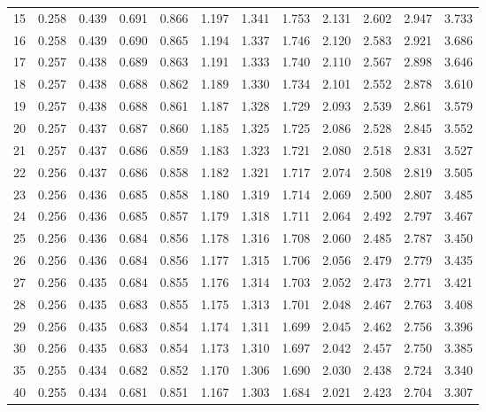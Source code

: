 \documentclass[a4paper, 10pt]{article}
\begin{document}
\begin{center}
\begin{supertabular}{rrrrrrrrrrrr}
        15       & 0.258 & 0.439 & 0.691 & 0.866 & 1.197 & 1.341 & 1.753 & 2.131  & 2.602  & 2.947  & 3.733 \\
        16       & 0.258 & 0.439 & 0.690 & 0.865 & 1.194 & 1.337 & 1.746 & 2.120  & 2.583  & 2.921  & 3.686 \\
        17       & 0.257 & 0.438 & 0.689 & 0.863 & 1.191 & 1.333 & 1.740 & 2.110  & 2.567  & 2.898  & 3.646 \\
        18       & 0.257 & 0.438 & 0.688 & 0.862 & 1.189 & 1.330 & 1.734 & 2.101  & 2.552  & 2.878  & 3.610 \\
        19       & 0.257 & 0.438 & 0.688 & 0.861 & 1.187 & 1.328 & 1.729 & 2.093  & 2.539  & 2.861  & 3.579 \\
        20       & 0.257 & 0.437 & 0.687 & 0.860 & 1.185 & 1.325 & 1.725 & 2.086  & 2.528  & 2.845  & 3.552 \\
        21       & 0.257 & 0.437 & 0.686 & 0.859 & 1.183 & 1.323 & 1.721 & 2.080  & 2.518  & 2.831  & 3.527 \\
        22       & 0.256 & 0.437 & 0.686 & 0.858 & 1.182 & 1.321 & 1.717 & 2.074  & 2.508  & 2.819  & 3.505 \\
        23       & 0.256 & 0.436 & 0.685 & 0.858 & 1.180 & 1.319 & 1.714 & 2.069  & 2.500  & 2.807  & 3.485 \\
        24       & 0.256 & 0.436 & 0.685 & 0.857 & 1.179 & 1.318 & 1.711 & 2.064  & 2.492  & 2.797  & 3.467 \\
        25       & 0.256 & 0.436 & 0.684 & 0.856 & 1.178 & 1.316 & 1.708 & 2.060  & 2.485  & 2.787  & 3.450 \\
        26       & 0.256 & 0.436 & 0.684 & 0.856 & 1.177 & 1.315 & 1.706 & 2.056  & 2.479  & 2.779  & 3.435 \\
        27       & 0.256 & 0.435 & 0.684 & 0.855 & 1.176 & 1.314 & 1.703 & 2.052  & 2.473  & 2.771  & 3.421 \\
        28       & 0.256 & 0.435 & 0.683 & 0.855 & 1.175 & 1.313 & 1.701 & 2.048  & 2.467  & 2.763  & 3.408 \\
        29       & 0.256 & 0.435 & 0.683 & 0.854 & 1.174 & 1.311 & 1.699 & 2.045  & 2.462  & 2.756  & 3.396 \\
        30       & 0.256 & 0.435 & 0.683 & 0.854 & 1.173 & 1.310 & 1.697 & 2.042  & 2.457  & 2.750  & 3.385 \\
        35       & 0.255 & 0.434 & 0.682 & 0.852 & 1.170 & 1.306 & 1.690 & 2.030  & 2.438  & 2.724  & 3.340 \\
        40       & 0.255 & 0.434 & 0.681 & 0.851 & 1.167 & 1.303 & 1.684 & 2.021  & 2.423  & 2.704  & 3.307 \\

\end{supertabular}
\end{center}
\end{document}
